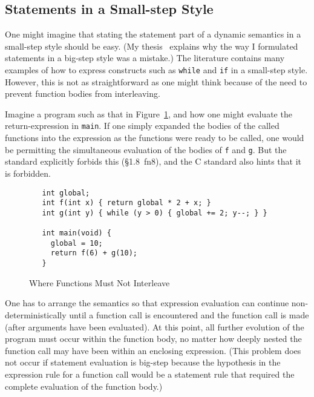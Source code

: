 \documentclass[11pt]{article}
\begin{document}
\subsection{Statements in a Small-step Style}
\label{sec:small-step-stmts}

One might imagine that stating the statement part of a dynamic
semantics in a small-step style should be easy.  (My
thesis~\cite[\S7.1]{Norrish98} explains why the way I formulated
statements in a big-step style was a mistake.) The literature contains
many examples of how to express constructs such as \texttt{while} and
\texttt{if} in a small-step style.  However, this is not as
straightforward as one might think because of the need to prevent
function bodies from interleaving.

Imagine a program such as that in Figure~\ref{fig:two-functions}, and
how one might evaluate the return-expression in \texttt{main}.  If one
simply expanded the bodies of the called functions into the expression
as the functions were ready to be called, one would be permitting the
simultaneous evaluation of the bodies of \texttt{f} and \texttt{g}.
But the \cpp{} standard explicitly forbids this (\S1.8~fn8), and the C
standard also hints that it is forbidden.
\begin{figure}[htbp]
\begin{verbatim}
   int global;
   int f(int x) { return global * 2 + x; }
   int g(int y) { while (y > 0) { global += 2; y--; } }

   int main(void) {
     global = 10;
     return f(6) + g(10);
   }
\end{verbatim}
\caption{Where Functions Must Not Interleave}
\label{fig:two-functions}
\end{figure}

One has to arrange the semantics so that expression evaluation can
continue non-deterministically until a function call is encountered
and the function call is made (after arguments have been evaluated).
At this point, all further evolution of the program must occur within
the function body, no matter how deeply nested the function call may
have been within an enclosing expression.  (This problem does not
occur if statement evaluation is big-step because the hypothesis in
the expression rule for a function call would be a statement rule that
required the complete evaluation of the function body.)
\end{document}
